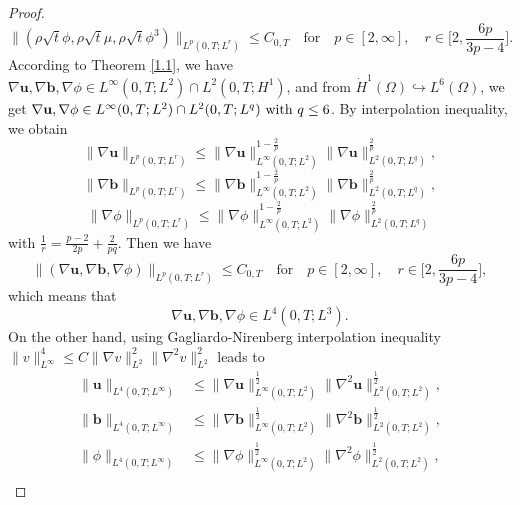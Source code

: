 \documentclass[11pt]{article}
\numberwithin{equation}{section}
\begin{document}
\begin{proof}
\begin{equation}
\|(\rho\sqrt{t}\phi, \rho\sqrt{t}\mu,\rho\sqrt{t}\phi^3)\|_{L^p(0,T;L^r)} \leq C_{0,T} \quad \text{for} \quad p \in [2,\infty], \quad r \in \Big[2, \frac{6p}{3p - 4}\Big].\label{eq-12}
\end{equation}
According to Theorem \ref{1.1}, we have $\nabla \mathbf{u}, \nabla \mathbf{b}, \nabla \phi \in L^\infty(0,T;L^2) \cap L^2(0,T;H^1)$, and from $\dot{H}^1(\Omega) \hookrightarrow L^6(\Omega)$, we get $\nabla \mathbf{u}, \nabla \phi \in L^\infty(0,T;L^2) \cap L^2(0,T;L^q)\) with \(q \leq 6$. By interpolation inequality, we obtain
\begin{equation*}
\|\nabla \mathbf{u}\|_{L^p(0,T;L^r)} \leq \|\nabla \mathbf{u}\|_{L^\infty(0,T;L^2)}^{1 - \frac{2}{p}} \|\nabla \mathbf{u}\|_{L^2(0,T;L^q)}^{\frac{2}{p}},
\end{equation*}
\begin{equation*}
\|\nabla \mathbf{b}\|_{L^p(0,T;L^r)} \leq \|\nabla \mathbf{b}\|_{L^\infty(0,T;L^2)}^{1 - \frac{2}{p}} \|\nabla \mathbf{b}\|_{L^2(0,T;L^q)}^{\frac{2}{p}},
\end{equation*}
\begin{equation*}
\|\nabla \phi\|_{L^p(0,T;L^r)} \leq \|\nabla \phi\|_{L^\infty(0,T;L^2)}^{1 - \frac{2}{p}} \|\nabla \phi\|_{L^2(0,T;L^q)}^{\frac{2}{p}}
\end{equation*}
with \(\frac{1}{r} = \frac{p - 2}{2p} + \frac{2}{pq}\). Then we have
\begin{equation*}
\|(\nabla \mathbf{u}, \nabla \mathbf{b}, \nabla \phi)\|_{L^p(0,T;L^r)} \leq C_{0,T} \quad \text{for} \quad p \in [2,\infty], \quad r \in \Big[2, \frac{6p}{3p - 4}\Big],
\end{equation*}
which means that
\begin{equation}
\nabla \mathbf{u}, \nabla \mathbf{b}, \nabla \phi \in L^4(0, T; L^3).\label{eq-15}
\end{equation}
On the other hand, using Gagliardo-Nirenberg interpolation inequality $\|v\|_{L^\infty}^4 \leq C\|\nabla v\|_{L^2}^2 \|\nabla^2 v\|_{L^2}^2$ leads to
\begin{align*}
\|\mathbf{u}\|_{L^4(0,T;L^\infty)} &\leq \|\nabla \mathbf{u}\|_{L^\infty(0,T;L^2)}^{\frac{1}{2}} \|\nabla^2 \mathbf{u}\|_{L^2(0,T;L^2)}^{\frac{1}{2}},\label{eq-16}  \\
\|\mathbf{b}\|_{L^4(0,T;L^\infty)} &\leq \|\nabla \mathbf{b}\|_{L^\infty(0,T;L^2)}^{\frac{1}{2}} \|\nabla^2 \mathbf{b}\|_{L^2(0,T;L^2)}^{\frac{1}{2}},  \\
\|\phi\|_{L^4(0,T;L^\infty)} &\leq \|\nabla \phi\|_{L^\infty(0,T;L^2)}^{\frac{1}{2}} \|\nabla^2 \phi\|_{L^2(0,T;L^2)}^{\frac{1}{2}},\\

\end{align*}
\end{proof}
\end{document}
